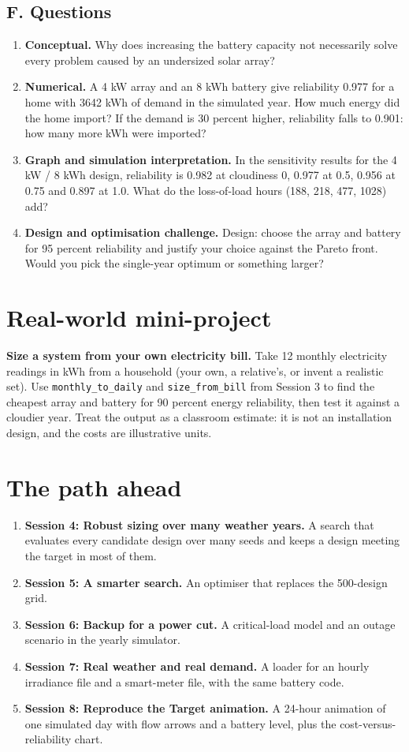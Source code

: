 \documentclass[11pt,a4paper]{article}
\begin{document}
\subsection*{F. Questions}
\begin{enumerate}[nosep]
\item \textbf{Conceptual.} Why does increasing the battery capacity not necessarily solve every problem caused by an undersized solar array?
\item \textbf{Numerical.} A 4 kW array and an 8 kWh battery give reliability 0.977 for a home with 3642 kWh of demand in the simulated year. How much energy did the home import? If the demand is 30 percent higher, reliability falls to 0.901: how many more kWh were imported?
\item \textbf{Graph and simulation interpretation.} In the sensitivity results for the 4 kW / 8 kWh design, reliability is 0.982 at cloudiness 0, 0.977 at 0.5, 0.956 at 0.75 and 0.897 at 1.0. What do the loss-of-load hours (188, 218, 477, 1028) add?
\item \textbf{Design and optimisation challenge.} Design: choose the array and battery for 95 percent reliability and justify your choice against the Pareto front. Would you pick the single-year optimum or something larger?
\end{enumerate}

\section{Real-world mini-project}
\textbf{Size a system from your own electricity bill.} Take 12 monthly electricity readings in kWh from a household (your own, a relative's, or invent a realistic set). Use \texttt{monthly\_to\_daily} and \texttt{size\_from\_bill} from Session 3 to find the cheapest array and battery for 90 percent energy reliability, then test it against a cloudier year. Treat the output as a classroom estimate: it is not an installation design, and the costs are illustrative units.

\section{The path ahead}
\begin{enumerate}[nosep]
\item \textbf{Session 4: Robust sizing over many weather years.} A search that evaluates every candidate design over many seeds and keeps a design meeting the target in most of them.
\item \textbf{Session 5: A smarter search.} An optimiser that replaces the 500-design grid.
\item \textbf{Session 6: Backup for a power cut.} A critical-load model and an outage scenario in the yearly simulator.
\item \textbf{Session 7: Real weather and real demand.} A loader for an hourly irradiance file and a smart-meter file, with the same battery code.
\item \textbf{Session 8: Reproduce the Target animation.} A 24-hour animation of one simulated day with flow arrows and a battery level, plus the cost-versus-reliability chart.
\end{enumerate}
\end{document}
